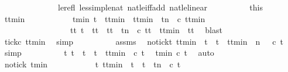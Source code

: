 \begin{isabellebody}
\ \ \ \ \ \ \ \ \ \ \ \ \ \ le{\isacharunderscore}refl\ less{\isacharunderscore}imp{\isacharunderscore}le{\isacharunderscore}nat\ nat{\isacharunderscore}le{\isacharunderscore}iff{\isacharunderscore}add\ nat{\isacharunderscore}le{\isacharunderscore}linear{\isacharparenright}\isanewline
\ \ \ \ \ \ \ \ \isamarkupfalse%
\ this\ \isamarkupfalse%
\ ttmin\ \isanewline
\ \ \ \ \ \ \ \ \ \ tmin{\isacharcolon}\ {\isacartoucheopen}t\ {\isacharless}\ ttmin\ {\isasymand}\ ttmin\ {\isasymle}\ t{\isacharplus}n\ {\isasymand}\ c\ ttmin\isanewline
\ \ \ \ \ \ \ \ \ \ \ \ \ \ \ \ {\isasymand}\ {\isacharparenleft}{\isasymforall}tt{\isacharprime}{\isachardot}\ {\isacharparenleft}t\ {\isacharless}\ tt{\isacharprime}\ {\isasymand}\ tt{\isacharprime}\ {\isasymle}\ t{\isacharplus}n\ {\isasymand}\ c\ tt{\isacharprime}{\isacharparenright}\ {\isasymlongrightarrow}\ ttmin\ {\isasymle}\ tt{\isacharprime}{\isacharparenright}{\isacartoucheclose}\ \isamarkupfalse%
\ blast\isanewline
\ \ \ \ \ \ \ \ \isamarkupfalse%
\ tick{\isacharcolon}{\isacartoucheopen}c\ ttmin{\isacartoucheclose}\ \isamarkupfalse%
\ simp\isanewline
\ \ \ \ \ \ \ \ \isamarkupfalse%
\ assms\ \isamarkupfalse%
\ notick{\isacharcolon}{\isacartoucheopen}{\isacharparenleft}{\isasymforall}t{\isacharprime}{\isachardot}\ ttmin\ {\isacharless}\ t{\isacharprime}\ {\isasymand}\ t{\isacharprime}\ {\isasymle}\ ttmin\ {\isacharplus}\ n\ {\isasymlongrightarrow}\ {\isasymnot}\ c\ t{\isacharprime}{\isacharparenright}{\isacartoucheclose}\ \isamarkupfalse%
\ simp\isanewline
\ \ \ \ \ \ \ \ \isamarkupfalse%
\ {\isacartoucheopen}{\isasymforall}t{\isacharprime}{\isachardot}\ {\isacharparenleft}t\ {\isacharless}\ t{\isacharprime}\ {\isasymand}\ t{\isacharprime}\ {\isacharless}\ ttmin{\isacharparenright}\ {\isasymlongrightarrow}\ {\isasymnot}c\ t{\isacharprime}{\isacartoucheclose}\ \isamarkupfalse%
\ tmin\ {\isacartoucheopen}{\isasymnot}c\ t{\isacartoucheclose}\ \isamarkupfalse%
\ auto\isanewline
\ \ \ \ \ \ \ \ \isamarkupfalse%
\ \isamarkupfalse%
\ notick\ tmin\ \isamarkupfalse%
\isanewline
\ \ \ \ \ \ \ \ \ \ {\isacartoucheopen}{\isasymforall}t{\isacharprime}{\isachardot}\ {\isacharparenleft}ttmin\ {\isacharless}\ t{\isacharprime}\ {\isasymand}\ t{\isacharprime}\ {\isasymle}\ t{\isacharplus}n{\isacharparenright}\ {\isasymlongrightarrow}\ {\isasymnot}c\ t{\isacharprime}{\isacartoucheclose}\ \isamarkupfalse%

\end{isabellebody}
